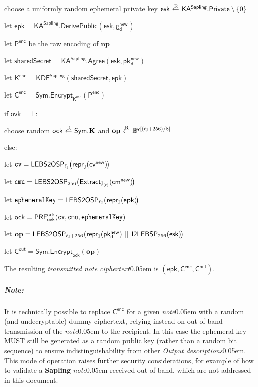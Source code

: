 \documentclass{article}
\let\oldmathtt\mathtt
\renewcommand{\mathtt}[1]{\scalebox{0.97}[1.07]{$\oldmathtt{#1}$}}
\newcommand{\textbnx}[1]{{\fontseries{b}\selectfont #1}}
\numberwithin{theorem}{subsection}
\newcommand{\tab}{\hspace{1.5em}}
\newcommand{\clasp}[3][0pt]{\stackengine{0pt}{#3}{\kern#1#2}{O}{c}{F}{F}{L}}
\newcommand{\term}[1]{\textsl{#1}\kern 0.05em\xspace}
\newcommand{\termbf}[1]{\textbf{#1}\xspace}
\newcommand{\conformance}[1]{\textbnx{#1}\xspace}
\newcommand{\Sapling}{\termbf{Sapling}}
\newcommand{\MUST}{\conformance{MUST}}
\newcommand{\note}{\term{note}}
\newcommand{\outputDescriptions}{\term{Output descriptions}}
\newcommand{\noteCiphertext}{\term{transmitted note ciphertext}}
\newcommand{\overlap}[2]{\rlap{#2}\hspace{#1}{#2}}
\newcommand{\byte}{\mathbb{B}\kern -0.1em\raisebox{0.55ex}{\overlap{0.0001em}{\scalebox{0.7}{$\mathbb{Y}$}}}}
\newcommand{\typeexp}[2]{{#1}\vphantom{)}^{[{#2}]}}
\newcommand{\byteseq}[1]{\typeexp{\byte}{#1}}
\newcommand{\bconcat}{\mathop{\kern 0.05em||}}
\newcommand{\setof}[1]{\{{#1}\}}
\newcommand{\leftarrowR}{\mathop{\clasp[0.15em]{\raisebox{1.15ex}{\scriptsize R}}{$\,\leftarrow\,$}}}
\newcommand{\enc}{\mathsf{enc}}
\newcommand{\DHSecret}[1]{\mathsf{sharedSecret}_{#1}}
\newcommand{\EphemeralPublic}{\mathsf{epk}}
\newcommand{\EphemeralPrivate}{\mathsf{esk}}
\newcommand{\OutViewingKey}{\mathsf{ovk}}
\newcommand{\OutCipherKey}{\mathsf{ock}}
\newcommand{\DiversifiedTransmitBaseNew}{\mathsf{g^{new}_d}}
\newcommand{\DiversifiedTransmitPublicNew}{\mathsf{pk^{new}_d}}
\newcommand{\PRF}[2]{\mathsf{{PRF}^{#2}_\mathnormal{#1}}}
\newcommand{\PRFock}[1]{\PRF{#1}{\OutCipherKey}}
\newcommand{\Sym}{\mathsf{Sym}}
\newcommand{\SymEncrypt}[1]{\Sym\mathsf{.Encrypt}_{#1}}
\newcommand{\Ptext}{\mathsf{P}}
\newcommand{\Ctext}{\mathsf{C}}
\newcommand{\Key}{\mathsf{K}}
\newcommand{\Keyspace}{\mathsf{Sym.}\mathbf{K}}
\newcommand{\TransmitPlaintext}[1]{\Ptext^\enc_{#1}}
\newcommand{\TransmitCiphertext}[1]{\Ctext^\enc_{#1}}
\newcommand{\TransmitKey}[1]{\Key^\enc_{#1}}
\newcommand{\OutCiphertext}{\Ctext^\mathsf{out}}
\newcommand{\KASapling}{\mathsf{KA^{Sapling}}}
\newcommand{\KASaplingPrivate}{\KASapling\mathsf{.Private}}
\newcommand{\KASaplingDerivePublic}{\KASapling\mathsf{.DerivePublic}}
\newcommand{\KASaplingAgree}{\KASapling\mathsf{.Agree}}
\newcommand{\KDFSapling}{\mathsf{KDF^{Sapling}}}
\newcommand{\NotePlaintext}[1]{\mathbf{np}_{#1}}
\newcommand{\OutPlaintext}{\mathbf{op}}
\newcommand{\cv}{\mathsf{cv}}
\newcommand{\cvNew}[1]{\cv^\mathsf{new}_{#1}}
\newcommand{\cm}{\mathsf{cm}}
\newcommand{\cmNew}[1]{\cm^\mathsf{new}_{#1}}
\newcommand{\cvField}{\mathtt{cv}}
\newcommand{\cmField}{\mathtt{cmu}}
\newcommand{\ephemeralKey}{\mathtt{ephemeralKey}}
\newcommand{\subgroupr}{(\kern-0.075emr\kern-0.075em)}
\newcommand{\Extract}{\mathsf{Extract}}
\newcommand{\GroupJ}{\mathbb{J}}
\newcommand{\SubgroupJ}{\mathbb{J}_{\subgroupr}}
\newcommand{\ellJ}{\ell_{\GroupJ}}
\newcommand{\reprJ}{\repr_{\GroupJ}}
\newcommand{\reprJOf}[1]{\reprJ\!\left({#1}\right)\!}
\newcommand{\ExtractJ}{\Extract_{\SubgroupJ}}
\newcommand{\repr}{\mathsf{repr}}
\newcommand{\ItoLEBSP}[1]{\mathsf{I2LEBSP}_{#1}}
\newcommand{\ItoLEBSPOf}[2]{\ItoLEBSP{#1}\!\left({#2}\right)}
\newcommand{\LEBStoOSP}[1]{\mathsf{LEBS2OSP}_{#1}}
\newcommand{\LEBStoOSPOf}[2]{\LEBStoOSP{#1}\!\left({#2}\right)}
\newcommand{\pnote}[1]{\subparagraph{Note:}{#1}}
\begin{document}
{\begin{algorithm}
  \item choose a uniformly random ephemeral private key $\EphemeralPrivate \leftarrowR \KASaplingPrivate \setminus \setof{0}$
  \item let $\EphemeralPublic = \KASaplingDerivePublic(\EphemeralPrivate, \DiversifiedTransmitBaseNew)$
  \item let $\TransmitPlaintext{}$ be the raw encoding of $\NotePlaintext{}$
  \item let $\DHSecret{} = \KASaplingAgree(\EphemeralPrivate, \DiversifiedTransmitPublicNew)$
  \item let $\TransmitKey{} = \KDFSapling(\DHSecret{}, \EphemeralPublic)$
  \item let $\TransmitCiphertext{} = \SymEncrypt{\TransmitKey{}}(\TransmitPlaintext{})$
  \item if $\OutViewingKey = \bot$:
  \item \tab choose random $\OutCipherKey \leftarrowR \Keyspace$ and $\OutPlaintext \leftarrowR \byteseq{(\ellJ + 256)/8}$
  \item else:
  \item \tab let $\cvField = \LEBStoOSP{\ellJ}\big(\reprJ(\cvNew{})\kern-0.12em\big)$
  \item \tab let $\cmField = \LEBStoOSP{256}\big(\ExtractJ(\cmNew{})\kern-0.15em\big)$
  \item \tab let $\ephemeralKey = \LEBStoOSPOf{\ellJ}{\reprJOf{\EphemeralPublic}}$
  \item \tab let $\OutCipherKey = \PRFock{\OutViewingKey}(\cvField, \cmField, \ephemeralKey)$
  \item \tab let $\OutPlaintext = \LEBStoOSPOf{\ellJ + 256}{\reprJ(\DiversifiedTransmitPublicNew) \,\bconcat\, \ItoLEBSPOf{256}{\EphemeralPrivate}\kern-0.12em}$
  \item \vspace{-2ex}
  \item let $\OutCiphertext = \SymEncrypt{\OutCipherKey}(\OutPlaintext)$
\end{algorithm}

The resulting \noteCiphertext is $(\EphemeralPublic, \TransmitCiphertext{}, \OutCiphertext)$.

\vspace{-2ex}
\pnote{
It is technically possible to replace $\TransmitCiphertext{}$ for a given \note
with a random (and undecryptable) dummy ciphertext, relying instead on out-of-band
transmission of the \note to the recipient. In this case the ephemeral key \MUST
still be generated as a random public key (rather than a random bit sequence) to ensure
indistinguishability from other \outputDescriptions. This mode of operation raises
further security considerations, for example of how to validate a \Sapling{} \note
received out-of-band, which are not addressed in this document.
} %
} %
\end{document}
